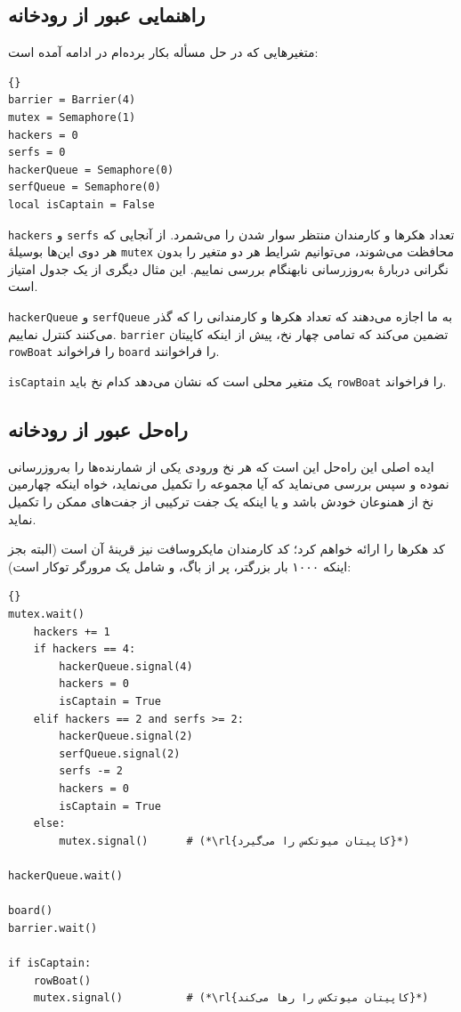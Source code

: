 \documentclass{book}
\newcommand{\clearemptydoublepage}{}%
\begin{document}
\clearemptydoublepage
\subsection {راهنمایی عبور از رودخانه}

    متغیرهایی که در حل مسأله بکار برده‌ام در ادامه آمده است:‌

\begin{latin}
\begin{lstlisting}[title=\rl{راهنمایی عبور از رودخانه}]{}
barrier = Barrier(4)
mutex = Semaphore(1)
hackers = 0
serfs = 0
hackerQueue = Semaphore(0)
serfQueue = Semaphore(0)
local isCaptain = False
\end{lstlisting}
\end{latin}

    {\tt hackers} و {\tt serfs}
    تعداد هکرها و کارمندان منتظر سوار شدن را می‌شمرد. از آنجایی که هر دوی این‌ها بوسیلهٔ {\tt mutex} محافظت می‌شوند، می‌توانیم شرایط هر دو متغیر را 
    بدون نگرانی دربارهٔ به‌روزرسانی‌ نابهنگام بررسی نماییم. این مثال دیگری از یک جدول امتیاز است. 

    {\tt hackerQueue} و {\tt serfQueue}
    به ما اجازه می‌دهند که تعداد هکرها و کارمندانی را که گذر می‌کنند کنترل نماییم. {\tt barrier} تضمین می‌کند که تمامی چهار نخ، پیش از اینکه 
    کاپیتان  {\tt rowBoat} را فراخواند  {\tt board}  را فراخوانند. 

    {\tt isCaptain} یک متغیر محلی است که نشان می‌دهد کدام نخ باید {\tt rowBoat} را فراخواند. 

\clearemptydoublepage
\subsection {راه‌حل عبور از رودخانه}

    ایده اصلی این راه‌حل این است که هر نخ ورودی یکی از شمارنده‌ها را به‌روزرسانی نموده و سپس بررسی می‌نماید که آیا مجموعه را تکمیل می‌نماید، خواه 
    اینکه چهارمین نخ از همنوعان خودش باشد و یا اینکه یک جفت ترکیبی از جفت‌‌های ممکن را تکمیل نماید. 

    کد هکرها را ارائه خواهم کرد؛ کد کارمندان مایکروسافت نیز قرینهٔ آن است (البته بجز اینکه ۱۰۰۰ بار بزرگتر، پر از باگ، و شامل یک مرورگر توکار است):

\begin{latin}
\begin{lstlisting}[title=\rl{راه‌حل عبور از رودخانه}]{}
mutex.wait()
    hackers += 1
    if hackers == 4:
        hackerQueue.signal(4)                
	    hackers = 0
	    isCaptain = True
    elif hackers == 2 and serfs >= 2:
        hackerQueue.signal(2)                
        serfQueue.signal(2)                  
	    serfs -= 2
	    hackers = 0
    	isCaptain = True
    else:
        mutex.signal()      # (*\rl{کاپیتان میوتکس را می‌گیرد}*)

hackerQueue.wait()           

board()
barrier.wait()            

if isCaptain:
    rowBoat()
    mutex.signal()          # (*\rl{کاپیتان میوتکس را رها می‌کند}*)
\end{lstlisting}
\end{latin}
\end{document}

